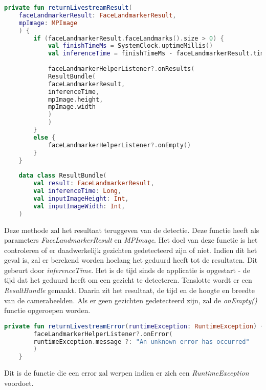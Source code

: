 \begin{lstlisting}[language=Kotlin, caption=returnLiveStreamResult in FaceLandmarkerHelper.kt, label={lst:returnLiveStreamResult}]
    private fun returnLivestreamResult(
    faceLandmarkerResult: FaceLandmarkerResult,
    mpImage: MPImage
    ) {
        if (faceLandmarkerResult.faceLandmarks().size > 0) {
            val finishTimeMs = SystemClock.uptimeMillis()
            val inferenceTime = finishTimeMs - faceLandmarkerResult.timestampMs()
            
            faceLandmarkerHelperListener?.onResults(
            ResultBundle(
            faceLandmarkerResult,
            inferenceTime,
            mpImage.height,
            mpImage.width
            )
            )
        }
        else {
            faceLandmarkerHelperListener?.onEmpty()
        }
    }
    
    data class ResultBundle(
        val result: FaceLandmarkerResult,
        val inferenceTime: Long,
        val inputImageHeight: Int,
        val inputImageWidth: Int,
    )
\end{lstlisting}
Deze methode zal het resultaat teruggeven van de detectie. Deze functie heeft als parameters \emph{FaceLandmarkerResult} en \emph{MPImage}. Het doel van deze functie is het controleren of er daadwerkelijk gezichten gedetecteerd zijn of niet. Indien dit het geval is, zal er berekend worden hoelang het geduurd heeft tot de resultaten. Dit gebeurt door \emph{inferenceTime}. Het is de tijd sinds de applicatie is opgestart - de tijd dat het geduurd heeft om een gezicht te detecteren. Tenslotte wordt er een \emph{ResultBundle} gemaakt. Daarin zit het resultaat, de tijd en de hoogte en breedte van de camerabeelden. Als er geen gezichten gedetecteerd zijn, zal de \emph{onEmpty()} functie opgeroepen worden.

\begin{lstlisting}[language=Kotlin, caption=returnLiveStreamError in FaceLandmarkerHelper.kt, label={lst:returnLivestreamError}]
    private fun returnLivestreamError(runtimeException: RuntimeException) {
        faceLandmarkerHelperListener?.onError(
        runtimeException.message ?: "An unknown error has occurred"
        )
    }
\end{lstlisting}
Dit is de functie die een error zal werpen indien er zich een \emph{RuntimeException} voordoet.

